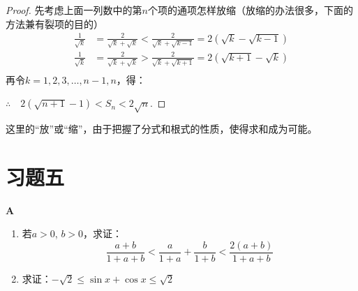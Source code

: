 \begin{proof}
    先考虑上面一列数中的第$n$个项的通项怎样放缩（放缩的办法很多，下面的方法兼有裂项的目的）
\[\begin{split}
\frac{1}{\sqrt{k}} &= \frac{2}{\sqrt{k}+\sqrt{k}}<\frac{2}{\sqrt{k}+\sqrt{k-1}} =2(\sqrt{k}-\sqrt{k-1}) \\   
\frac{1}{\sqrt{k}} &=  \frac{2}{\sqrt{k}+\sqrt{k}}>\frac{2}{\sqrt{k}+\sqrt{k+1}} =2(\sqrt{k+1}-\sqrt{k}) \\    
\end{split}\]
再令$k=1,2,3,\ldots,n-1,n$，得：
\begin{flushleft}
\end{flushleft}

$\therefore\quad 2\left(\sqrt{n+1}-1\right)<S_n<2\sqrt{n}$.

\end{proof}

\begin{rmk}
  这里的“放”或“缩”，由于把握了分式和根式的性质，使得求和成为可能。 
\end{rmk}

\section*{习题五}
\begin{center}
    \bfseries A
\end{center}

\begin{enumerate}
    \item 若$a>0$, $b>0$，求证：
\[\frac{a+b}{1+a+b}<\frac{a}{1+a}+\frac{b}{1+b}<\frac{2(a+b)}{1+a+b}\]
\item 求证：$-\sqrt{2}\le \sin x+\cos x\le \sqrt{2}$
\end{enumerate}

